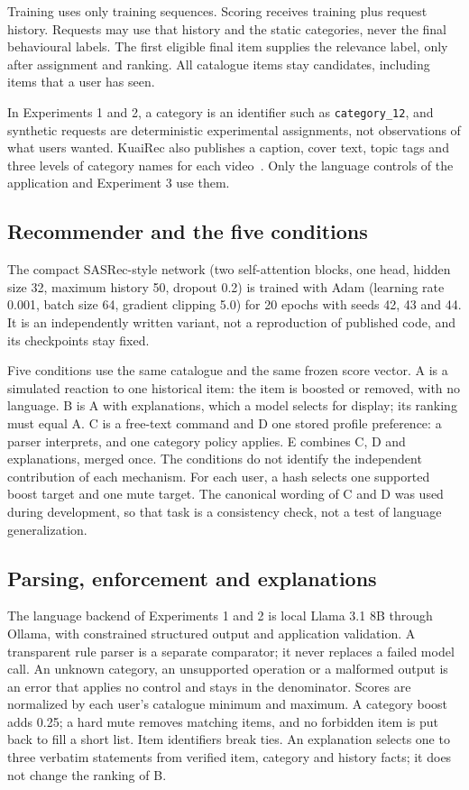 \documentclass[conference]{IEEEtran}
\begin{document}
Training uses only training sequences. Scoring receives training plus request history. Requests may use that history and the static categories, never the final behavioural labels. The first eligible final item supplies the relevance label, only after assignment and ranking. All catalogue items stay candidates, including items that a user has seen.

In Experiments 1 and 2, a category is an identifier such as \texttt{category\_12}, and synthetic requests are deterministic experimental assignments, not observations of what users wanted. KuaiRec also publishes a caption, cover text, topic tags and three levels of category names for each video~\cite{kuairecdocs}. Only the language controls of the application and Experiment 3 use them.

\subsection{Recommender and the five conditions}
The compact SASRec-style network (two self-attention blocks, one head, hidden size 32, maximum history 50, dropout 0.2) is trained with Adam (learning rate 0.001, batch size 64, gradient clipping 5.0) for 20 epochs with seeds 42, 43 and 44. It is an independently written variant, not a reproduction of published code, and its checkpoints stay fixed.

Five conditions use the same catalogue and the same frozen score vector. A is a simulated reaction to one historical item: the item is boosted or removed, with no language. B is A with explanations, which a model selects for display; its ranking must equal A. C is a free-text command and D one stored profile preference: a parser interprets, and one category policy applies. E combines C, D and explanations, merged once. The conditions do not identify the independent contribution of each mechanism. For each user, a hash selects one supported boost target and one mute target. The canonical wording of C and D was used during development, so that task is a consistency check, not a test of language generalization.

\subsection{Parsing, enforcement and explanations}
The language backend of Experiments 1 and 2 is local Llama 3.1 8B through Ollama, with constrained structured output and application validation. A transparent rule parser is a separate comparator; it never replaces a failed model call. An unknown category, an unsupported operation or a malformed output is an error that applies no control and stays in the denominator. Scores are normalized by each user's catalogue minimum and maximum. A category boost adds 0.25; a hard mute removes matching items, and no forbidden item is put back to fill a short list. Item identifiers break ties. An explanation selects one to three verbatim statements from verified item, category and history facts; it does not change the ranking of B.
\end{document}
